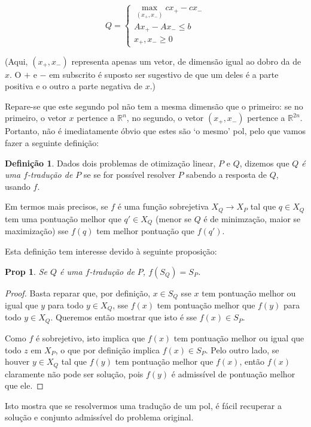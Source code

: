 \documentclass{article}
\newcommand{\R}{\mathbb{R}}
\newtheorem{prop}{Prop}
\theoremstyle{definition}
\newtheorem{definition}{Definição}
\begin{document}
	\[
	Q =
	\begin{cases}
	\max\limits_{(x_+, x_-)} cx_+ - cx_-\\
	Ax_+ - Ax_- \leq b\\
	x_+, x_- \geq 0
	\end{cases}
	\]
	
	(Aqui, $(x_+,x_-)$ representa apenas um vetor, de dimensão igual ao dobro da de $x$. O $+$ e $-$ em subscrito é suposto ser sugestivo de que um deles é a parte positiva e o outro a parte negativa de $x$.)
	
	Repare-se que este segundo pol não tem a mesma dimensão que o primeiro: se no primeiro, o vetor $x$ pertence a $\R^n$, no segundo, o vetor $(x_+, x_-)$ pertence a $\R^{2n}$. Portanto, não é imediatamente óbvio que estes são `o mesmo' pol, pelo que vamos fazer a seguinte definição:
	
	\begin{definition}
	Dados dois problemas de otimização linear, $P$ e $Q$, dizemos que \emph{$Q$ é uma $f$-tradução de $P$} se se for possível resolver $P$ sabendo a resposta de $Q$, usando $f$.
	
	Em termos mais precisos, se $f$ é uma função sobrejetiva $X_Q \rightarrow X_P$ tal que $q \in X_Q$ tem uma pontuação melhor que $q' \in X_Q$ (menor se $Q$ é de minimzação, maior se maximização) sse $f(q)$ tem melhor pontuação que $f(q')$.
	\end{definition}
	
	Esta definição tem interesse devido à seguinte proposição:
	
	\begin{prop}
	Se $Q$ é uma $f$-tradução de $P$, $f(S_Q) = S_P$.
	\end{prop}
	\begin{proof}
	Basta reparar que, por definição, $x \in S_Q$ sse $x$ tem pontuação melhor ou igual que $y$ para todo $y \in X_Q$, sse $f(x)$ tem pontuação melhor que $f(y)$ para todo $y \in X_Q$. Queremos então mostrar que isto é sse $f(x) \in S_P$.
	
	Como $f$ é sobrejetivo, isto implica que $f(x)$ tem pontuação melhor ou igual que todo $z$ em $X_P$, o que por definição implica $f(x) \in S_P$. Pelo outro lado, se houver $y \in X_Q$ tal que $f(y)$ tem pontuação melhor que $f(x)$, então $f(x)$ claramente não pode ser solução, pois $f(y)$ é admissível de pontuação melhor que ele.
	\end{proof}
	
	Isto mostra que se resolvermos uma tradução de um pol, é fácil recuperar a solução e conjunto admissível do problema original.
	
\end{document}
